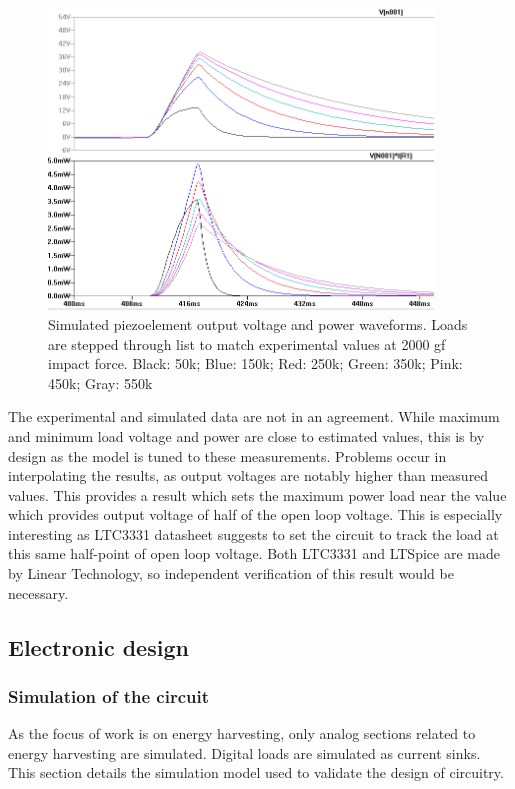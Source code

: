  \begin{figure}[htb]
  \begin{center}
  \includegraphics[height=8cm]{images/own_dwg/ltspice_piezo_simulation}
  \end{center}
  \caption{Simulated piezoelement output voltage and power waveforms. Loads are stepped through list to match experimental values at 2000 gf impact force. Black: 50k; Blue: 150k; Red: 250k; Green: 350k; Pink: 450k; Gray: 550k}
  \label{fiq:piezo_simulation_experimental}
\end{figure}

The experimental and simulated data are not in an agreement. While maximum and minimum load voltage and power are close to estimated values, this is by design as the model is tuned to these measurements. Problems occur in interpolating the results, as output voltages are notably higher than measured values. This provides a result which sets the maximum power load near the value which provides output voltage of half of the open loop voltage. This is especially interesting as LTC3331 datasheet \cite{Technology} suggests to set the circuit to track the load at this same half-point of open loop voltage. Both LTC3331 and LTSpice are made by Linear Technology, so independent verification of this result would be necessary. 

\subsection{Electronic design} \label{sect:electronic_design}
\subsubsection{Simulation of the circuit}
As the focus of work is on energy harvesting, only analog sections related to energy harvesting are simulated. Digital loads are simulated as current sinks. This section details the simulation model used to validate the design of circuitry.

